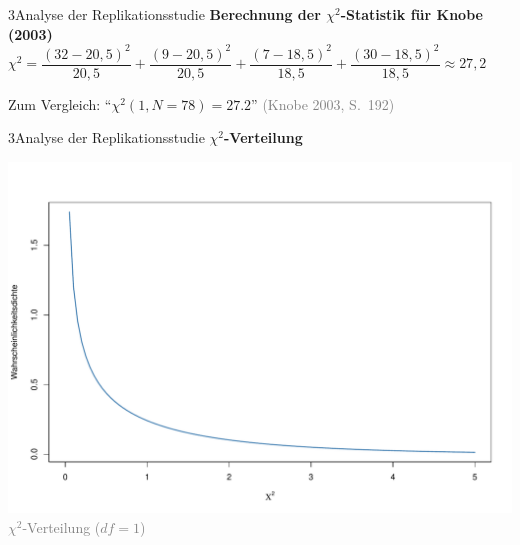 \documentclass[xcolor=table,9pt,aspectratio=169]{beamer}
\begin{document}
\begin{frame}{\vspace*{10mm}3\hspace*{1em}Analyse der Replikationsstudie}
\textbf{Berechnung der $\chi^{2}$-Statistik für Knobe (2003)}\\
\smallskip
$\chi^{2}=\dfrac{(32-20,5)^{2}}{20,5}+\dfrac{(9-20,5)^{2}}{20,5}+\dfrac{(7-18,5)^{2}}{18,5}+\dfrac{(30-18,5)^{2}}{18,5}\approx27,2$

\bigskip
Zum Vergleich: \enquote{$\chi^{2}(1,N=78)=27.2$} \textcolor{gray}{(Knobe 2003, S.~192)}
\end{frame}


\begin{frame}{\vspace*{10mm}3\hspace*{1em}Analyse der Replikationsstudie}
\textbf{$\chi^{2}$-Verteilung}\\
\begin{center}
   \includegraphics[width=0.5\linewidth]{figures/replication_knobe_distribution.pdf}\\
   \textcolor{gray}{$\chi^{2}$-Verteilung ($df=1$)}
\end{center}

\end{frame}
\end{document}
